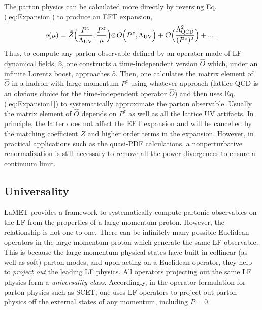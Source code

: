 \documentclass[aps,rmp,reprint,amsmath,amssymb,graphicx,longbibliography]{revtex4-1} %
\begin{document}
The parton physics can be calculated more directly by reversing
Eq. (\ref{eq:Expansion}) to produce an EFT expansion,
\begin{align}
	o(\mu)= \tilde Z\Big({P^z\over\Lambda_{\rm UV}},
	{P^z\over \mu}\Big){\otimes} O\Big(P^z,\Lambda_{\rm UV}\Big) + {\cal O}\Big({\Lambda_{\rm QCD}^2\over (P^z)^2}\Big)+ ... \ .
	\label{eq:Expansion1}
\end{align}
Thus, to compute any parton observable defined by an operator made of LF dynamical fields, $\hat o$, one constructs a time-independent version $\hat O$ which, under an infinite
Lorentz boost, approaches $\hat o$. Then, one calculates the matrix element
of $\hat O$ in a hadron with large momentum $P^z$ using
whatever approach (lattice QCD is an obvious choice for the time-independent operator $\hat O$)
and then uses Eq. (\ref{eq:Expansion1}) to systematically approximate the parton {observable}.
Usually the matrix element of $\hat O$ depends on $P^z$ as well as all the lattice UV artifacts.
In principle, the latter does not affect the EFT expansion and will be cancelled by the matching coefficient $\tilde Z$ and higher order terms in the expansion. However,
in practical applications such as the quasi-PDF calculations, a nonperturbative renormalization is still necessary to remove all the power divergences to ensure a continuum limit.

\subsection{Universality}
\label{sec:lamet-univ}
LaMET provides a framework to systematically
compute partonic observables on the LF from the properties of
a large-momentum proton.
However, the relationship is not one-to-one. There can be
infinitely many possible Euclidean operators in the large-momentum proton
which generate the same LF observable. This is because
the large-momentum physical states have built-in
collinear (as well as soft) parton modes, and upon acting on
a Euclidean operator, they help to {\it project out}
the leading LF physics. All operators projecting out
the same LF physics form a {\it universality class}.
Accordingly, in the operator formulation
for parton physics such as SCET, one uses
LF operators to project out parton physics off the external
states of any momentum, including $P=0$.
\end{document}
